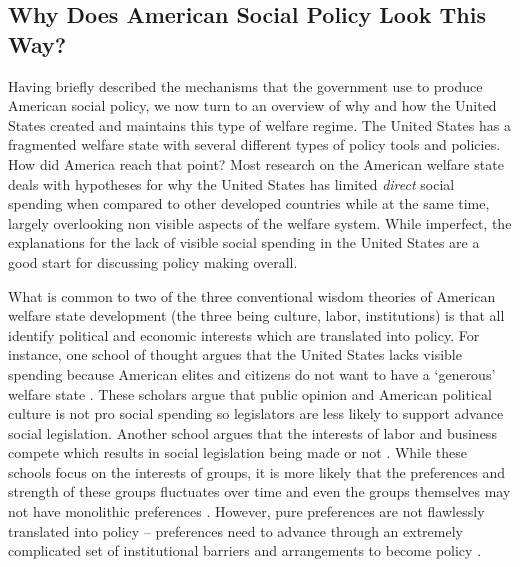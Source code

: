 \documentclass[12pt]{article}
\begin{document}
\subsection{Why Does American Social Policy Look This Way?}
Having briefly described the mechanisms that the government use to produce American social policy, we now turn to an overview of why and how the United States created and maintains this type of welfare regime. The United States has a fragmented welfare state with several different types of policy tools and policies. How did America reach that point? Most research on the American welfare state deals with hypotheses for why the United States has limited \emph{direct} social spending when compared to other developed countries while at the same time, largely overlooking non visible aspects of the welfare system. While imperfect, the explanations for the lack of visible social spending in the United States are a good start for discussing policy making overall. 

What is common to two of the three conventional wisdom theories of American welfare state development (the three being culture, labor, institutions) is that all identify political and economic interests which are translated into policy. For instance, one school of thought argues that the United States lacks visible spending because American elites and citizens do not want to have a `generous' welfare state \citep{king1973}. These scholars argue that public opinion and American political culture is not pro social spending so legislators are less likely to support advance social legislation. Another school argues that the interests of labor and business compete which results in social legislation being made or not \citep{korpi1980, swenson2004}. While these schools focus on the interests of groups, it is more likely that the preferences and strength of these groups fluctuates over time and even the groups themselves may not have monolithic preferences \citep{hacker2002b}. However, pure preferences are not flawlessly translated into policy -- preferences need to advance through an extremely complicated set of institutional barriers and arrangements to become policy \citep{pierson1995, robertson2011}. 
\end{document}
